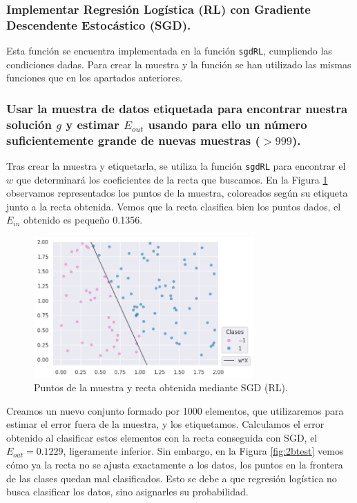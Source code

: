 \documentclass[a4paper, 20pt]{article}
\begin{document}
\subsubsection{Implementar Regresión Logística (RL) con Gradiente Descendente Estocástico (SGD).}

Esta función se encuentra implementada en la función \texttt{sgdRL}, cumpliendo las condiciones dadas. Para crear la muestra y la función se han utilizado las mismas funciones que en los apartados anteriores.

\subsubsection{Usar la muestra de datos etiquetada para encontrar nuestra solución $g$ y estimar $E_{out}$ usando para ello un número suficientemente grande de nuevas muestras ($>999$).}

Tras crear la muestra y etiquetarla, se utiliza la función \texttt{sgdRL} para encontrar el $w$ que determinará los coeficientes de la recta que buscamos. En la Figura \ref{fig:22b} observamos representados los puntos de la muestra, coloreados según su etiqueta junto a la recta obtenida. Vemos que la recta clasifica bien los puntos dados, el $E_{in}$ obtenido es pequeño 0.1356.

\begin{figure}[H]
    \centering
    \includegraphics[width=0.75\textwidth]{2rl}
    \caption{Puntos de la muestra y recta obtenida mediante SGD (RL).}
    \label{fig:22b}
\end{figure}

Creamos un nuevo conjunto formado por 1000 elementos, que utilizaremos para estimar el error fuera de la muestra, y los etiquetamos. Calculamos el error obtenido al clasificar estos elementos con la recta conseguida con SGD, el $E_{out} = 0.1229$, ligeramente inferior. Sin embargo, en la Figura \ref{fig:2btest} vemos cómo ya la recta no se ajusta exactamente a los datos, los puntos en la frontera de las clases quedan mal clasificados. Esto se debe a que regresión logística no busca clasificar los datos, sino asignarles su probabilidad.
\end{document}
